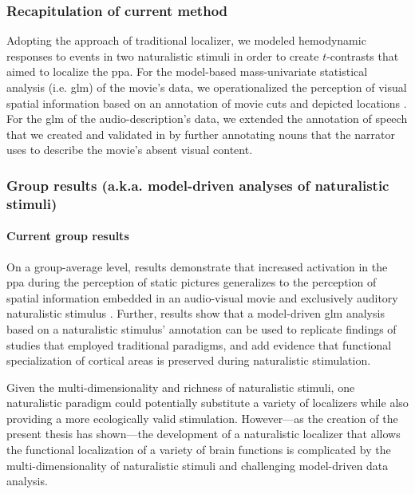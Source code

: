 \subsubsection{Recapitulation of current method}
Adopting the approach of traditional localizer, we modeled hemodynamic responses
to events in two naturalistic stimuli in order to create $t$-contrasts that
aimed to localize the \ac{ppa}.
For the model-based mass-univariate statistical analysis (i.e. \ac{glm}) of the
movie's data, we operationalized the perception of visual spatial information
based on an annotation of movie cuts and depicted locations
\citep{haeusler2016cutanno}.
For the \ac{glm} of the audio-description's data, we extended the annotation of
speech that we created and validated in \citep{haeusler2021speechanno} by
further annotating nouns that the narrator uses to describe the movie's absent
visual content.


\subsubsection{Group results (a.k.a. model-driven analyses of naturalistic
stimuli)}

\paragraph{Current group results}
On a group-average level, results demonstrate that increased activation in the
\ac{ppa} during the perception of static pictures generalizes to the perception
of spatial information embedded in an audio-visual movie and exclusively
auditory naturalistic stimulus \citep{haeusler2022processing}.
Further, results show that a model-driven \ac{glm} analysis based on a
naturalistic stimulus' annotation can be used to replicate findings of studies
that employed traditional paradigms, and add evidence
\citep[cf.][]{bartels2004mapping} that functional specialization of cortical
areas is preserved during naturalistic stimulation.



%
Given the multi-dimensionality and richness of naturalistic stimuli, one
naturalistic paradigm could potentially substitute a variety of localizers while
also providing a more ecologically valid stimulation.
%
However---as the creation of the present thesis has shown---the development of a
naturalistic localizer that allows the functional localization of a variety of
brain functions is complicated by the multi-dimensionality of naturalistic
stimuli and challenging model-driven data analysis.


